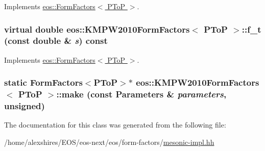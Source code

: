 Implements \hyperlink{classeos_1_1FormFactors_3_01PToP_01_4_a987757eb4559de496005ed2730e78a10}{eos::FormFactors$<$ PToP $>$}.\hypertarget{classeos_1_1KMPW2010FormFactors_3_01PToP_01_4_ac679f7283ec7f07e47f31629fe412344}{
\subsubsection[{f\_\-t}]{\setlength{\rightskip}{0pt plus 5cm}virtual double eos::KMPW2010FormFactors$<$ {\bf PToP} $>$::f\_\-t (const double \& {\em s}) const}}
\label{classeos_1_1KMPW2010FormFactors_3_01PToP_01_4_ac679f7283ec7f07e47f31629fe412344}


Implements \hyperlink{classeos_1_1FormFactors_3_01PToP_01_4_ae753d67d42936bd32b043838e7fb769a}{eos::FormFactors$<$ PToP $>$}.\hypertarget{classeos_1_1KMPW2010FormFactors_3_01PToP_01_4_a0366ccc66d7c15c3eff6c261371d50a8}{
\subsubsection[{make}]{\setlength{\rightskip}{0pt plus 5cm}static FormFactors$<${\bf PToP}$>$$\ast$ eos::KMPW2010FormFactors$<$ {\bf PToP} $>$::make (const {\bf Parameters} \& {\em parameters}, \/  unsigned)}}
\label{classeos_1_1KMPW2010FormFactors_3_01PToP_01_4_a0366ccc66d7c15c3eff6c261371d50a8}


The documentation for this class was generated from the following file:\begin{DoxyCompactItemize}
\item 
/home/alexshires/EOS/eos-\/next/eos/form-\/factors/\hyperlink{mesonic-impl_8hh}{mesonic-\/impl.hh}\end{DoxyCompactItemize}
